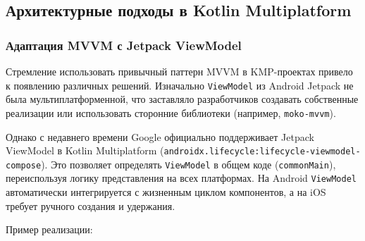 \documentclass[14pt, russian]{scrartcl}
\begin{document}
\subsection{Архитектурные подходы в Kotlin Multiplatform}

\subsubsection{Адаптация MVVM с Jetpack ViewModel}

Стремление использовать привычный паттерн MVVM в KMP-проектах привело к появлению различных решений. Изначально \texttt{ViewModel} из Android Jetpack не была мультиплатформенной, что заставляло разработчиков создавать собственные реализации или использовать сторонние библиотеки (например, \texttt{moko-mvvm}).

Однако с недавнего времени Google официально поддерживает Jetpack ViewModel в Kotlin Multiplatform (\texttt{androidx.lifecycle:lifecycle-viewmodel-compose}). Это позволяет определять \texttt{ViewModel} в общем коде (\texttt{commonMain}), переиспользуя логику представления на всех платформах. На Android \texttt{ViewModel} автоматически интегрируется с жизненным циклом компонентов, а на iOS требует ручного создания и удержания.

Пример реализации:
\end{document}
